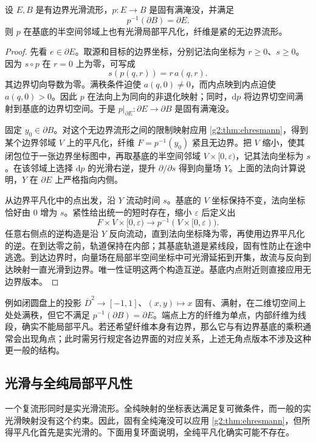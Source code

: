 \begin{proposition}\label{g2:prop:ehresmann-base-boundary}
	设 \(E,B\) 是有边界光滑流形，\(p:E\to B\) 是固有满淹没，并满足
	\[
		p^{-1}(\partial B)=\partial E.
	\]
	则 \(p\) 在基底的半空间邻域上也有光滑局部平凡化，纤维是紧的无边界流形。
\end{proposition}
\begin{proof}
	先看 \(e\in\partial E\)。取源和目标的边界坐标，分别记法向坐标为 \(r\geq0\)、\(s\geq0\)。因为 \(s\circ p\) 在 \(r=0\) 上为零，可写成
	\[
		s(p(q,r))=r\,a(q,r).
	\]
	其边界切向导数为零。满秩条件迫使 \(a(q,0)\ne0\)，而内点映到内点迫使 \(a(q,0)>0\)。因此 \(p\) 在法向上为同向的非退化映射；同时，\(\mathrm{d}p\) 将边界切空间满射到基底的边界切空间。于是 \(p|_{\partial E}:\partial E\to\partial B\) 是固有满淹没。

	固定 \(y_0\in\partial B\)。对这个无边界流形之间的限制映射应用 \cref{g2:thm:ehresmann}，得到某个边界邻域 \(V\) 上的平凡化，纤维 \(F=p^{-1}(y_0)\) 紧且无边界。把 \(V\) 缩小，使其闭包位于一张边界坐标图中，再取基底的半空间邻域 \(V\times[0,\varepsilon)\)，记其法向坐标为 \(s\)。在该邻域上选择 \(\mathrm{d}p\) 的光滑右逆，提升 \(\partial/\partial s\) 得到向量场 \(Y\)。上面的法向计算说明，\(Y\) 在 \(\partial E\) 上严格指向内侧。

	从边界平凡化中的点出发，沿 \(Y\) 流动时间 \(s\)。基底的 \(V\) 坐标保持不变，法向坐标恰好由 \(0\) 增为 \(s\)。紧性给出统一的短时存在，缩小 \(\varepsilon\) 后定义出
	\[
		F\times V\times[0,\varepsilon)\longrightarrow p^{-1}(V\times[0,\varepsilon)).
	\]
	任意右侧点的逆构造是沿 \(Y\) 反向流动，直到法向坐标降为零，再使用边界平凡化的逆。在到达零之前，轨道保持在内部；其基底轨道是紧线段，固有性防止在途中逃逸。到达边界时，向量场在局部半空间坐标中可光滑延拓到开集，故流与反向到达映射一直光滑到边界。唯一性证明这两个构造互逆。基底内点附近则直接应用无边界版本。
\end{proof}

例如闭圆盘上的投影 \(\overline D^2\to[-1,1]\)、\((x,y)\mapsto x\) 固有、满射，在二维切空间上处处满秩，但它不满足 \(p^{-1}(\partial B)=\partial E\)。端点上方的纤维为单点，内部纤维为线段，确实不能局部平凡。若还希望纤维本身有边界，那么它与有边界基底的乘积通常会出现角点；此时需另行规定各边界面的对应关系，上述无角点版本不涉及这种更一般的结构。

\subsection{光滑与全纯局部平凡性}
\label{g2:subsec:1506:06}

一个复流形同时是实光滑流形。全纯映射的坐标表达满足复可微条件，而一般的实光滑映射没有这个约束。因此，固有全纯淹没可以应用 \cref{g2:thm:ehresmann}，但所得平凡化首先是实光滑的。下面用复环面说明，全纯平凡化确实可能不存在。

